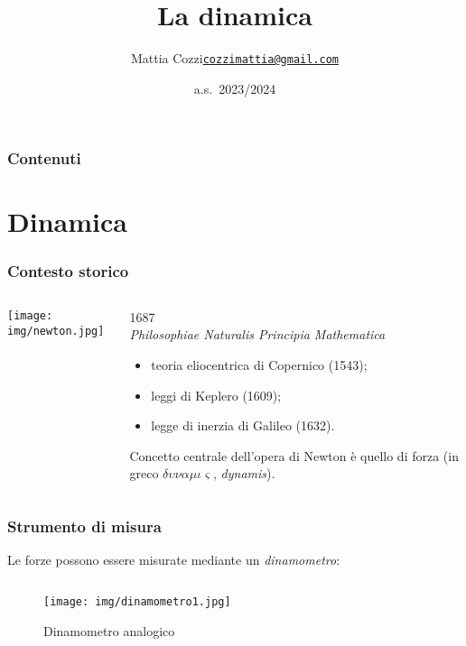 \documentclass[]{beamer}
\title{La dinamica}
\author{\texorpdfstring{Mattia Cozzi\newline\href{mailto:cozzimattia@gmail.com}{\texttt{cozzimattia@gmail.com}}}{Mattia Cozzi}}
\date{a.s.~2023/2024}
\theoremstyle{plain}
\begin{document}
\begin{frame}
  \titlepage
\end{frame}





\begin{frame}
\frametitle{Contenuti}
\tableofcontents
\end{frame}








\section{Dinamica}


\begin{frame}
\frametitle{Contesto storico}
\begin{columns}
\begin{column}{0.2\textwidth}
\texttt{[image: img/newton.jpg]}
\end{column}
\begin{column}{0.7\textwidth}
1687\\\emph{Philosophiae Naturalis Principia Mathematica}\pause

\begin{itemize}
\item teoria eliocentrica di Copernico (1543);\pause
\item leggi di Keplero (1609);\pause
\item legge di inerzia di Galileo (1632).\pause
\end{itemize}
Concetto centrale dell'opera di Newton è quello di \alert{forza} (in greco $ \delta \upsilon \nu \alpha \mu \iota \varsigma $, \emph{dynamis}).
\end{column}
\end{columns}
\end{frame}



\begin{frame}
  \frametitle{Strumento di misura}
    Le forze possono essere misurate mediante un \emph{dinamometro}:
  \begin{columns}
    \begin{column}{0.45\textwidth}
      \begin{figure}
        \texttt{[image: img/dinamometro1.jpg]}
        
        Dinamometro analogico
      \end{figure}
      
    \end{column}
    \begin{column}{0.45\textwidth}
    \end{column}
  \end{columns}
\end{frame}
\end{document}
